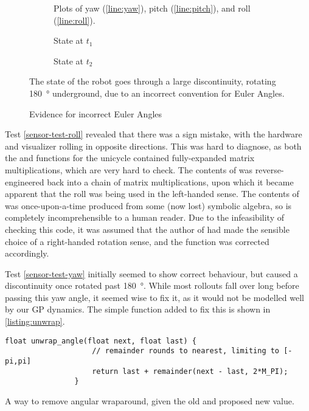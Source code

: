 \documentclass[main.tex]{subfiles}
\begin{document}
		\begin{figure}
			\centering
			\begin{subfigure}[t]{0.333\linewidth-2em}
				
				\caption{
					Plots of yaw (\ref{line:yaw}), pitch (\ref{line:pitch}), and roll (\ref{line:roll}).
				}
			\end{subfigure}\hfill
			\begin{subfigure}[t]{0.333\linewidth-2em}
				
				\caption{State at $t_1$}
			\end{subfigure}\hfill
			\begin{subfigure}[t]{0.333\linewidth-2em}
				
				\caption{State at $t_2$}
			\end{subfigure}
			\caption{Evidence for incorrect Euler Angles}
			\label{fig:bad-euler}
			\medskip
			\small
			The state of the robot goes through a large discontinuity, rotating \SI{180}{\degree} underground, due to an incorrect convention for Euler Angles.
		\end{figure}

		Test \ref{sensor-test-roll} revealed that there was a sign mistake, with the hardware and visualizer rolling in opposite directions.
		This was hard to diagnose, as both the  and  functions for the unicycle contained fully-expanded matrix multiplications, which are very hard to check.
		The contents of  was reverse-engineered back into a chain of matrix multiplications, upon which it became apparent that the roll was being used in the left-handed sense.
		The contents of  was once-upon-a-time produced from some (now lost) symbolic algebra, so is completely incomprehensible to a human reader.
		Due to the infeasibility of checking this code, it was assumed that the author of  had made the sensible choice of a right-handed rotation sense, and the  function was corrected accordingly.

		Test \cref{sensor-test-yaw} initially seemed to show correct behaviour, but caused a discontinuity once rotated past \SI{180}{\degree}.
		While most rollouts fall over long before passing this yaw angle, it seemed wise to fix it, as it would not be modelled well by our GP dynamics.
		The simple function added to fix this is shown in \cref{listing:unwrap}.

		\begin{listingfloat}
			\begin{lstlisting}[language={[11]C++}, gobble=8, frame=single]
				float unwrap_angle(float next, float last) {
					// remainder rounds to nearest, limiting to [-pi,pi]
					return last + remainder(next - last, 2*M_PI);
				}
			\end{lstlisting}
			\caption{A way to remove angular wraparound, given the old and proposed new value.}
			\label{listing:unwrap}
		\end{listingfloat}
\end{document}
